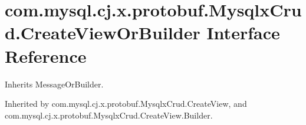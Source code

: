 \hypertarget{interfacecom_1_1mysql_1_1cj_1_1x_1_1protobuf_1_1_mysqlx_crud_1_1_create_view_or_builder}{}\section{com.\+mysql.\+cj.\+x.\+protobuf.\+Mysqlx\+Crud.\+Create\+View\+Or\+Builder Interface Reference}
\label{interfacecom_1_1mysql_1_1cj_1_1x_1_1protobuf_1_1_mysqlx_crud_1_1_create_view_or_builder}


Inherits Message\+Or\+Builder.



Inherited by com.\+mysql.\+cj.\+x.\+protobuf.\+Mysqlx\+Crud.\+Create\+View, and com.\+mysql.\+cj.\+x.\+protobuf.\+Mysqlx\+Crud.\+Create\+View.\+Builder.

